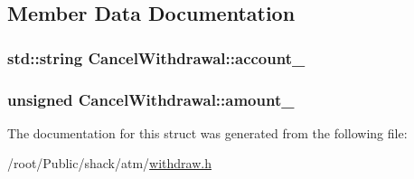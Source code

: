 \subsection{Member Data Documentation}
\hypertarget{structCancelWithdrawal_a4a081ab8be5299d5032139dbe774603f}{
\subsubsection[{account\-\_\-}]{\setlength{\rightskip}{0pt plus 5cm}std\-::string Cancel\-Withdrawal\-::account\-\_\-}}\label{structCancelWithdrawal_a4a081ab8be5299d5032139dbe774603f}
\hypertarget{structCancelWithdrawal_a27d03ed0ebc0fbd59b82076431782bcf}{
\subsubsection[{amount\-\_\-}]{\setlength{\rightskip}{0pt plus 5cm}unsigned Cancel\-Withdrawal\-::amount\-\_\-}}\label{structCancelWithdrawal_a27d03ed0ebc0fbd59b82076431782bcf}


The documentation for this struct was generated from the following file\-:\begin{DoxyCompactItemize}
\item 
/root/\-Public/shack/atm/\hyperlink{withdraw_8h}{withdraw.\-h}\end{DoxyCompactItemize}

